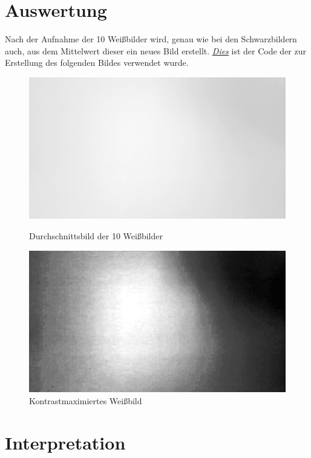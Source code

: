 \documentclass[12pt, oneside, a4paper, \docLanguage]{report}
\begin{document}
\section{Auswertung}
\label{chap:VERSUCH_3_AUSWERTUNG}
Nach der Aufnahme der 10 Weißbilder wird, genau wie bei den Schwarzbildern auch, aus dem Mittelwert dieser ein neues Bild erstellt. \hyperref[chap:APPENDIX_SOURCECODE_V3]{\textit{Dies}} ist der Code der zur Erstellung des folgenden Bildes verwendet wurde.
\begin{figure}[H]
\centering
\includegraphics[scale=0.5]{../AverageWhiteImage.png}
\caption{Durchschnittsbild der 10 Weißbilder}
\includegraphics[scale=0.5]{../AverageWhiteImageMaxContrast.png}
\caption{Kontrastmaximiertes Weißbild}
\end{figure}
\pagebreak
\section{Interpretation}
\label{chap:VERSUCH_3_INTERPRETATION}
\end{document}
